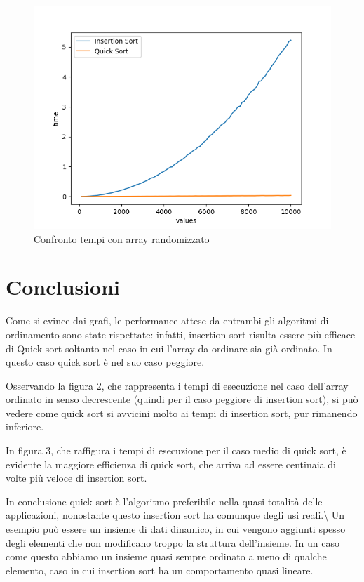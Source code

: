 \documentclass[
]{article}
\begin{document}
\begin{figure}[h!]
	\centering
	\includegraphics{../img/rand/rand_comparison10000.png}
		\caption{Confronto tempi con array randomizzato}
	\label{fig:3}
\end{figure}
\newpage


\hypertarget{conclusioni}{%
\section{Conclusioni}\label{conclusioni}}

Come si evince dai grafi, le performance attese da entrambi gli
algoritmi di ordinamento sono state rispettate: infatti, insertion sort
risulta essere più efficace di Quick sort soltanto nel caso in cui
l'array da ordinare sia già ordinato. In questo caso quick sort è nel
suo caso peggiore.

Osservando la figura 2, che rappresenta i tempi di esecuzione nel caso
dell'array ordinato in senso decrescente (quindi per il caso peggiore di
insertion sort), si può vedere come quick sort si avvicini molto ai
tempi di insertion sort, pur rimanendo inferiore.

In figura 3, che raffigura i tempi di esecuzione per il caso medio di
quick sort, è evidente la maggiore efficienza di quick sort, che arriva
ad essere centinaia di volte più veloce di insertion sort.

In conclusione quick sort è l'algoritmo preferibile nella quasi totalità delle applicazioni, nonostante questo insertion sort ha comunque degli
usi reali.\textbackslash{} Un esempio può essere un insieme di dati
dinamico, in cui vengono aggiunti spesso degli elementi che non
modificano troppo la struttura dell'insieme. In un caso come questo
abbiamo un insieme quasi sempre ordinato a meno di qualche elemento,
caso in cui insertion sort ha un comportamento quasi lineare.
\end{document}
